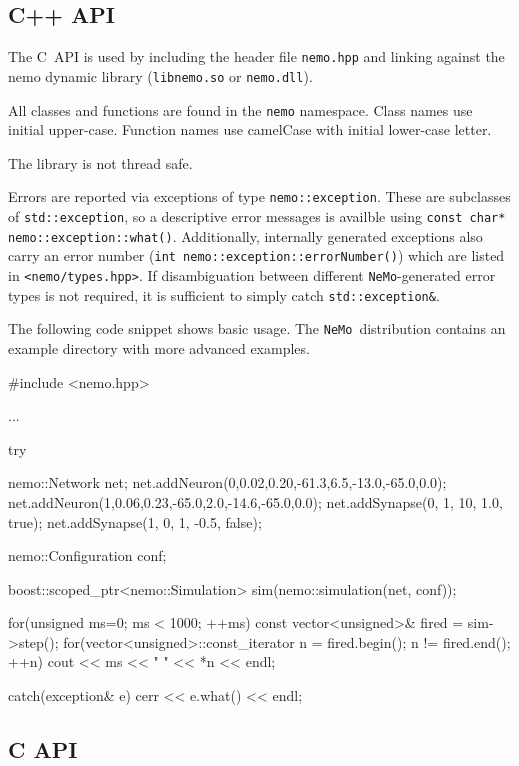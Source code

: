 \documentclass[a4paper]{article}
\newcommand{\nemo}{\texttt{NeMo}}
\newcommand{\code}[1]{\texttt{#1}}
\newcommand{\file}[1]{\texttt{#1}}
\newcommand{\cpp}{C\nolinebreak\hspace{-.05em}\raisebox{.4ex}{\tiny\bf +}\nolinebreak\hspace{-.10em}\raisebox{.4ex}{\tiny\bf +}}
\begin{document}
\newpage

\subsection{C++ API}
\label{api:cpp}

The \cpp\ API is used by including the header file \file{nemo.hpp}
and linking against the nemo dynamic library (\file{libnemo.so} or \file{nemo.dll}).

All classes and functions are found in the \code{nemo} namespace.
Class names use initial upper-case. 
Function names use camelCase with initial lower-case letter.

The library is not thread safe.

Errors are reported via exceptions of type \code{nemo::exception}.
These are subclasses of \code{std::exception},
	so a descriptive error messages is availble using \code{const char* nemo::exception::what()}.
Additionally, 
	internally generated exceptions also carry an error number
	(\code{int nemo::exception::errorNumber()})
	which are listed in \code{<nemo/types.hpp>}.
If disambiguation between different \nemo-generated error types is not required,
	it is sufficient to simply catch \code{std::exception\&}.

The following code snippet shows basic usage.
The \nemo\ distribution contains an example directory with more advanced examples.

\begin{ccode}
#include <nemo.hpp>

...

try {
	nemo::Network net;
	net.addNeuron(0,0.02,0.20,-61.3,6.5,-13.0,-65.0,0.0);
	net.addNeuron(1,0.06,0.23,-65.0,2.0,-14.6,-65.0,0.0);
	net.addSynapse(0, 1, 10, 1.0, true);
	net.addSynapse(1, 0, 1, -0.5, false);

	nemo::Configuration conf;

	boost::scoped_ptr<nemo::Simulation>
		sim(nemo::simulation(net, conf)); 

	for(unsigned ms=0; ms < 1000; ++ms) {
		const vector<unsigned>& fired = sim->step();
		for(vector<unsigned>::const_iterator n = fired.begin();
				n != fired.end(); ++n) {
			cout << ms << " " << *n << endl;
		}
	}

} catch(exception& e) {
	cerr << e.what() << endl;
}

\end{ccode}

\newpage

\subsection{C API}
\label{api:c}
\end{document}
